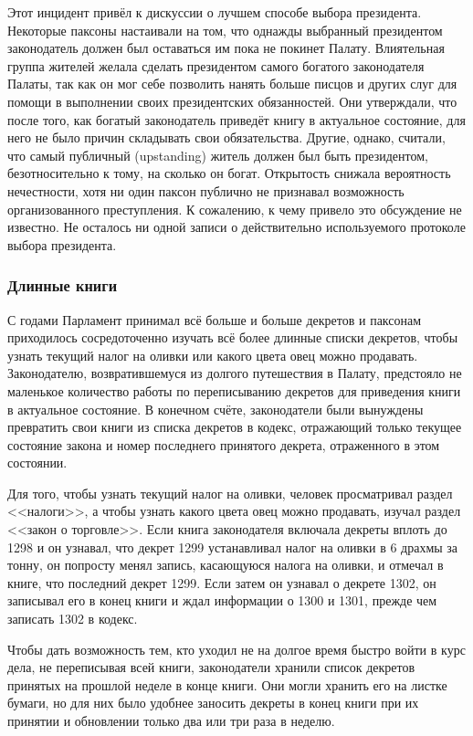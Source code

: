 \documentclass[12pt, a4paper]{article} %
\begin{document}
Этот инцидент привёл к дискуссии о лучшем способе выбора президента. Некоторые паксоны настаивали на том, что однажды выбранный президентом законодатель должен был оставаться им пока не покинет Палату. Влиятельная группа жителей желала сделать президентом самого богатого законодателя Палаты, так как он мог себе позволить нанять больше писцов и других слуг для помощи в выполнении своих президентских обязанностей. Они утверждали, что после того, как богатый законодатель приведёт книгу в актуальное состояние, для него не было причин складывать свои обязательства. Другие, однако, считали, что самый публичный (upstanding) житель должен был быть президентом, безотносительно к тому, на сколько он богат. Открытость снижала вероятность нечестности, хотя ни один паксон публично не признавал возможность организованного преступления. К сожалению, к чему привело это обсуждение не известно. Не осталось ни одной записи о действительно используемого протоколе выбора президента.

\subsubsection{Длинные книги}

С годами Парламент принимал всё больше и больше декретов и паксонам приходилось сосредоточенно изучать всё более длинные списки декретов, чтобы узнать текущий налог на оливки или какого цвета овец можно продавать. Законодателю, возвратившемуся из долгого путешествия в Палату, предстояло не маленькое количество работы по переписыванию декретов для приведения книги в актуальное состояние. В конечном счёте, законодатели были вынуждены превратить свои книги из списка декретов в кодекс, отражающий только текущее состояние закона и номер последнего принятого декрета, отраженного в этом состоянии.

Для того, чтобы узнать текущий налог на оливки, человек просматривал раздел <<налоги>>, а чтобы узнать какого цвета овец можно продавать, изучал раздел <<закон о торговле>>. Если книга законодателя включала декреты вплоть до 1298 и он узнавал, что декрет 1299 устанавливал налог на оливки в 6 драхмы за тонну, он попросту менял запись, касающуюся налога на оливки, и отмечал в книге, что последний декрет 1299. Если затем он узнавал о декрете 1302, он записывал его в конец книги и ждал информации о 1300 и 1301, прежде чем записать 1302 в кодекс.

Чтобы дать возможность тем, кто уходил не на долгое время быстро войти в курс дела, не переписывая всей книги, законодатели хранили список декретов принятых на прошлой неделе в конце книги. Они могли хранить его на листке бумаги, но для них было удобнее заносить декреты в конец книги при их принятии и обновлении только два или три раза в неделю.
\end{document}

